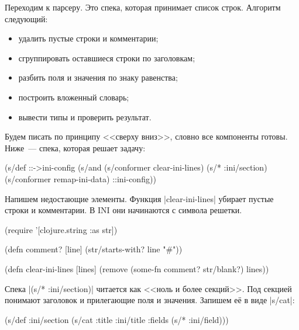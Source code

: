 Переходим к парсеру. Это спека, которая принимает список строк. Алгоритм
следующий:

\begin{itemize}

\item
  удалить пустые строки и комментарии;

\item
  сгруппировать оставшиеся строки по заголовкам;

\item
  разбить поля и значения по знаку равенства;

\item
  построить вложенный словарь;

\item
  вывести типы и проверить результат.

\end{itemize}

Будем писать по принципу <<сверху вниз>>, словно все компоненты готовы. Ниже~---
спека, которая решает задачу:

\begin{english}
  \begin{clojure}
(s/def ::->ini-config
  (s/and
   (s/conformer clear-ini-lines)
   (s/* :ini/section)
   (s/conformer remap-ini-data)
   ::ini-config))
  \end{clojure}
\end{english}


Напишем недостающие элементы. Функция \spverb|clear-ini-lines| убирает пустые
строки и комментарии. В INI они начинаются с символа решетки.

\begin{english}
  \begin{clojure}
(require '[clojure.string :as str])

(defn comment? [line]
  (str/starts-with? line "#"))

(defn clear-ini-lines [lines]
  (remove (some-fn comment? str/blank?) lines))
  \end{clojure}
\end{english}


Спека \spverb|(s/* :ini/section)| читается как <<ноль и более секций>>. Под
секцией понимают заголовок и прилегающие поля и значения. Запишем е\"{е} в виде
\spverb|s/cat|:

\begin{english}
  \begin{clojure}
(s/def :ini/section
  (s/cat :title :ini/title :fields (s/* :ini/field)))
  \end{clojure}
\end{english}

